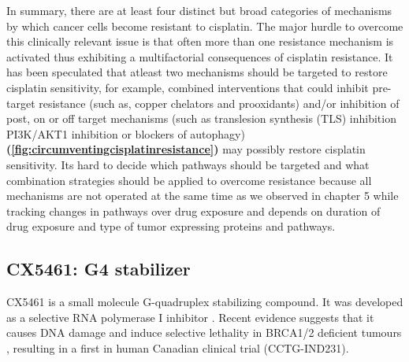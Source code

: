 In summary, there are at least four distinct but broad categories of mechanisms by which cancer cells become resistant to cisplatin. The major hurdle to overcome this clinically relevant issue is that often more than one resistance mechanism is activated thus exhibiting a multifactorial consequences of cisplatin resistance. It has been speculated that atleast two mechanisms should be targeted to restore cisplatin sensitivity, for example, combined interventions that could inhibit pre-target resistance (such as, copper chelators and prooxidants) and/or inhibition of post, on  or off target mechanisms (such as translesion synthesis (TLS) inhibition PI3K/AKT1 inhibition or blockers of autophagy)  \textbf{(\autoref{fig:circumventingcisplatinresistance})} may possibly restore cisplatin sensitivity. Its hard to decide which pathways should be targeted and what combination strategies should be applied to overcome resistance because all mechanisms are not operated at the same time as we observed in chapter 5 while tracking changes in pathways over drug exposure and depends on duration of drug exposure and type of tumor expressing proteins and pathways.

\subsection{CX5461: G4 stabilizer} 
CX5461 is a small molecule G-quadruplex stabilizing compound. It was developed as a selective RNA polymerase I inhibitor \cite{drygin2011targeting}. Recent evidence suggests that it causes DNA damage and induce selective lethality in BRCA1/2 deficient tumours \cite{xu2017cx}, resulting in a first in human Canadian clinical trial (CCTG-IND231). 
 
